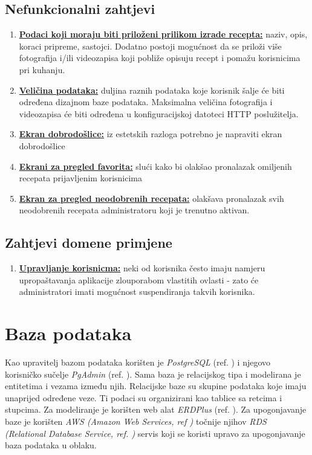 \documentclass[times, utf8, zavrsni]{fer}
\begin{document}
\section{Nefunkcionalni zahtjevi}
\begin{enumerate}
      \item \textbf{\underline{Podaci koji moraju biti priloženi prilikom izrade recepta:}} naziv, opis, koraci pripreme,
            sastojci. Dodatno postoji mogućnost da se priloži više fotografija
            i/ili videozapisa koji pobliže opisuju recept i pomažu korisnicima pri kuhanju.
      \item \textbf{\underline{Veličina podataka:}} duljina raznih podataka koje korisnik šalje će biti
            određena dizajnom baze podataka. Maksimalna veličina fotografija i videozapisa će biti određena
            u konfiguracijskoj datoteci HTTP poslužitelja.
      \item \textbf{\underline{Ekran dobrodošlice:}} iz estetskih razloga potrebno je napraviti
            ekran dobrodošlice
      \item \textbf{\underline{Ekrani za pregled favorita:}} slući kako bi olakšao pronalazak omiljenih recepata prijavljenim korisnicima
      \item \textbf{\underline{Ekran za pregled neodobrenih recepata:}} olakšava pronalazak svih neodobrenih recepata administratoru koji je trenutno aktivan.
\end{enumerate}

\section{Zahtjevi domene primjene}
\begin{enumerate}
      \item \textbf{\underline{Upravljanje korisnicma:}} neki od korisnika često imaju namjeru
            upropaštavanja aplikacije zlouporabom vlastitih ovlasti - zato će administratori imati
            mogućnost suspendiranja takvih korisnika.

\end{enumerate}
\chapter{Baza podataka}
Kao upravitelj bazom podataka korišten je \textit{PostgreSQL} (ref. \cite{PostgreSQL})  i njegovo korisničko sučelje \textit{PgAdmin} (ref. \cite{PgAdmin}).
Sama baza je relacijskog tipa i modelirana je entitetima i vezama između njih.
Relacijske baze su skupine podataka koje imaju unaprijed određene veze. Ti podaci su organizirani kao tablice sa retcima
i stupcima.
Za modeliranje je korišten web alat \textit{ERDPlus} (ref. \cite{ERDPlus}). Za upogonjavanje baze je korišten \textit{AWS (Amazon Web Services, ref \cite{AWS})}
točnije njihov \textit{RDS (Relational Database Service, ref. \cite{RDS})} servis koji se koristi upravo za upogonjavanje baza podataka u oblaku.
\end{document}
